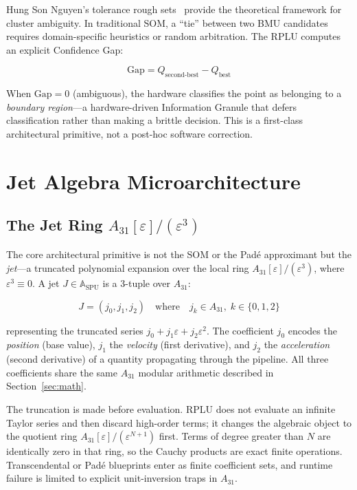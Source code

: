 \documentclass[conference]{IEEEtran}
\begin{document}
Hung Son Nguyen's tolerance rough sets~\cite{nguyen1999} provide the
theoretical framework for cluster ambiguity. In traditional SOM, a
``tie'' between two BMU candidates requires domain-specific heuristics
or random arbitration. The RPLU computes an explicit Confidence Gap:

\begin{equation}
\text{Gap} = Q_{\text{second-best}} - Q_{\text{best}}
\end{equation}

When $\text{Gap} = 0$ (ambiguous), the hardware classifies the point as
belonging to a \emph{boundary region}—a hardware-driven Information
Granule that defers classification rather than making a brittle
decision. This is a first-class architectural primitive, not a post-hoc
software correction.


\section{Jet Algebra Microarchitecture}
\label{sec:jet}

	\subsection{The Jet Ring $A_{31}[\varepsilon]/(\varepsilon^3)$}

The core architectural primitive is not the SOM or the Pad\'{e} approximant
	but the \emph{jet}---a truncated polynomial expansion over the local ring
	$A_{31}[\varepsilon]/(\varepsilon^3)$, where
$\varepsilon^3 \equiv 0$. A jet $J \in \mathbb{A}_{\text{SPU}}$ is a
3-tuple over $A_{31}$:

\begin{equation}
J = (j_0, j_1, j_2) \quad\text{where}\quad
	j_k \in A_{31},\; k \in \{0, 1, 2\}
\end{equation}

representing the truncated series $j_0 + j_1\varepsilon + j_2\varepsilon^2$.
The coefficient $j_0$ encodes the \emph{position} (base value), $j_1$ the
\emph{velocity} (first derivative), and $j_2$ the \emph{acceleration}
(second derivative) of a quantity propagating through the pipeline. All
three coefficients share the same $A_{31}$ modular arithmetic
described in Section~\ref{sec:math}.

The truncation is made before evaluation. RPLU does not evaluate an infinite
Taylor series and then discard high-order terms; it changes the algebraic
object to the quotient ring $A_{31}[\varepsilon]/(\varepsilon^{N+1})$ first.
Terms of degree greater than $N$ are identically zero in that ring, so the
Cauchy products are exact finite operations. Transcendental or Pad\'{e}
blueprints enter as finite coefficient sets, and runtime failure is limited
to explicit unit-inversion traps in $A_{31}$.
\end{document}
